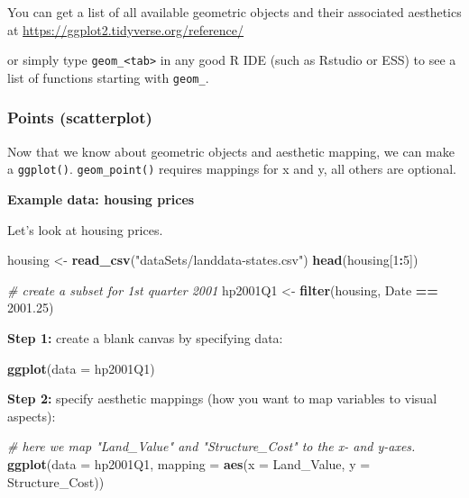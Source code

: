 \documentclass[]{book}
\newenvironment{Shaded}{\begin{snugshade}}{\end{snugshade}}
\newcommand{\KeywordTok}[1]{\textcolor[rgb]{0.13,0.29,0.53}{\textbf{#1}}}
\newcommand{\DataTypeTok}[1]{\textcolor[rgb]{0.13,0.29,0.53}{#1}}
\newcommand{\DecValTok}[1]{\textcolor[rgb]{0.00,0.00,0.81}{#1}}
\newcommand{\FloatTok}[1]{\textcolor[rgb]{0.00,0.00,0.81}{#1}}
\newcommand{\StringTok}[1]{\textcolor[rgb]{0.31,0.60,0.02}{#1}}
\newcommand{\CommentTok}[1]{\textcolor[rgb]{0.56,0.35,0.01}{\textit{#1}}}
\newcommand{\OperatorTok}[1]{\textcolor[rgb]{0.81,0.36,0.00}{\textbf{#1}}}
\newcommand{\NormalTok}[1]{#1}
\begin{document}
You can get a list of all available geometric objects and their
associated aesthetics at \url{https://ggplot2.tidyverse.org/reference/}

or simply type \texttt{geom\_\textless{}tab\textgreater{}} in any good R
IDE (such as Rstudio or ESS) to see a list of functions starting with
\texttt{geom\_}.

\subsubsection{Points (scatterplot)}\label{points-scatterplot}

Now that we know about geometric objects and aesthetic mapping, we can
make a \texttt{ggplot()}. \texttt{geom\_point()} requires mappings for x
and y, all others are optional.

\textbf{Example data: housing prices}

Let's look at housing prices.

\begin{Shaded}
\begin{Highlighting}[]
\NormalTok{housing <-}\StringTok{ }\KeywordTok{read_csv}\NormalTok{(}\StringTok{"dataSets/landdata-states.csv"}\NormalTok{)}
\KeywordTok{head}\NormalTok{(housing[}\DecValTok{1}\OperatorTok{:}\DecValTok{5}\NormalTok{])}

\CommentTok{# create a subset for 1st quarter 2001}
\NormalTok{hp2001Q1 <-}\StringTok{ }\KeywordTok{filter}\NormalTok{(housing, Date }\OperatorTok{==}\StringTok{ }\FloatTok{2001.25}\NormalTok{)}
\end{Highlighting}
\end{Shaded}

\textbf{Step 1:} create a blank canvas by specifying data:

\begin{Shaded}
\begin{Highlighting}[]
\KeywordTok{ggplot}\NormalTok{(}\DataTypeTok{data =}\NormalTok{ hp2001Q1)}
\end{Highlighting}
\end{Shaded}

\textbf{Step 2:} specify aesthetic mappings (how you want to map
variables to visual aspects):

\begin{Shaded}
\begin{Highlighting}[]
\CommentTok{# here we map "Land_Value" and "Structure_Cost" to the x- and y-axes.}
\KeywordTok{ggplot}\NormalTok{(}\DataTypeTok{data =}\NormalTok{ hp2001Q1, }\DataTypeTok{mapping =} \KeywordTok{aes}\NormalTok{(}\DataTypeTok{x =}\NormalTok{ Land_Value, }\DataTypeTok{y =}\NormalTok{ Structure_Cost))}
\end{Highlighting}
\end{Shaded}
\end{document}
